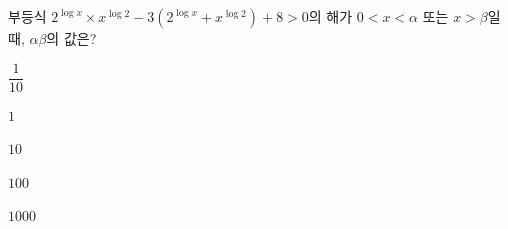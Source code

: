 부등식 $2^{\log x}\times x^{\log 2}-3(2^{\log x}+x^{\log 2})+8>0$의 해가 $0<x<\alpha$ 또는 $x>\beta$일 때, $\alpha\beta$의 값은?
\begin{choices32}{\rule[-3ex]{0pt}{8ex}$\dfrac{1}{10}$}{\rule[-3ex]{0pt}{8ex}$1$}{\rule[-3ex]{0pt}{8ex}$10$}{\rule[-3ex]{0pt}{8ex}$100$}{\rule[-3ex]{0pt}{8ex}$1000$}\end{choices32}
